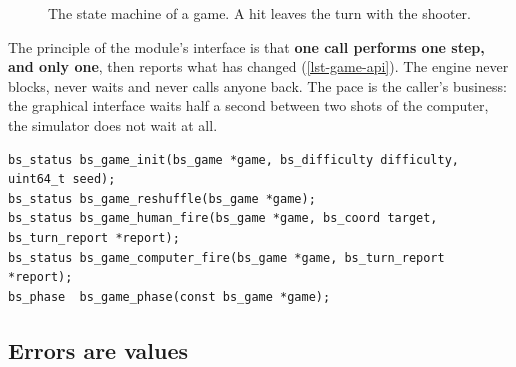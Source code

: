 \begin{figure}[ht]
    \centering
    \caption{The state machine of a game. A hit leaves the turn with the shooter.}
    \label{fig-automate}
\end{figure}

The principle of the module's interface is that \textbf{one call performs one step, and only
    one}, then reports what has changed (\cref{lst-game-api}). The engine never blocks, never
waits and never calls anyone back. The pace is the caller's business: the graphical interface
waits half a second between two shots of the computer, the simulator does not wait at all.

\begin{lstlisting}[basicstyle=\ttfamily\footnotesize,
                   caption={The essentials of the interface of a game
                            (\fichier{include/battleship/game.h}).}, label={lst-game-api}]
bs_status bs_game_init(bs_game *game, bs_difficulty difficulty, uint64_t seed);
bs_status bs_game_reshuffle(bs_game *game);
bs_status bs_game_human_fire(bs_game *game, bs_coord target, bs_turn_report *report);
bs_status bs_game_computer_fire(bs_game *game, bs_turn_report *report);
bs_phase  bs_game_phase(const bs_game *game);
\end{lstlisting}

\subsection{Errors are values}

